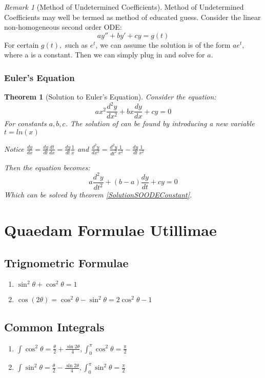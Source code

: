 \documentclass[12pt,a4paper]{article}
\newtheorem{theorem}{Theorem}[subsection]
\theoremstyle{definition}
\theoremstyle{remark}
\newtheorem{remark}{Remark}[section]
\begin{document}
\begin{remark}[Method of Undetermined Coefficients]
	Method of Undetermined Coefficients may well be termed as method of educated guess.
	Consider the linear non-homogeneous second order ODE:
\begin{equation}
	ay'' + by' + cy = g(t)
\end{equation}
For certain $g(t),$ such as $e^t$, we can assume the solution is of the form $ae^t,$ where a is a constant. Then we can simply plug in and solve for $a.$

\end{remark}

\subsubsection{Euler's Equation}
\begin{theorem}[Solution to Euler's Equation]
	Consider the equation:
\[
	ax^2 \frac{d^2y}{dx^2} + bx \frac{dy}{dx} + cy = 0
\]
For constants $a,b,c$. The solution of can be found by introducing a new variable $t = ln(x)$

Notice $ \frac{dy}{dx} = \frac{dy}{dt} \frac{dt}{dx} = \frac{dy}{dt} \frac{1}{x}$
and $ \frac{d^2y}{dx^2} = \frac{d^2y}{dt^2} \frac{1}{x^2} - \frac{dy}{dt} \frac{1}{x^2}$

Then the equation becomes:
\[
	a\frac{d^2y}{dt^2} + (b-a)\frac{dy}{dt} + cy = 0
\]
Which can be solved by theorem \ref{SolutionSOODEConstant}.
\end{theorem}










\newpage

\section{Quaedam Formulae Utillimae}
\subsection{Trignometric Formulae}
\begin{enumerate}
\item $\sin^2{\theta} + \cos^2{\theta} = 1$
\item $\cos(2\theta) = \cos^2{\theta} - \sin^2{\theta} = 2\cos^2{\theta} - 1$

\end{enumerate}
\subsection{Common Integrals}
\begin{enumerate}
	\item $\int \cos^2{\theta} = \frac{\theta}{2} + \frac{\sin{2\theta}}{4}, \int_0^{\pi} \cos^2{\theta} = \frac{\pi}{2} $
	\item $\int \sin^2{\theta} = \frac{\theta}{2} - \frac{\sin{2\theta}}{4},  \int_0^{\pi} \sin^2{\theta} = \frac{\pi}{2} $
\end{enumerate}
\end{document}
